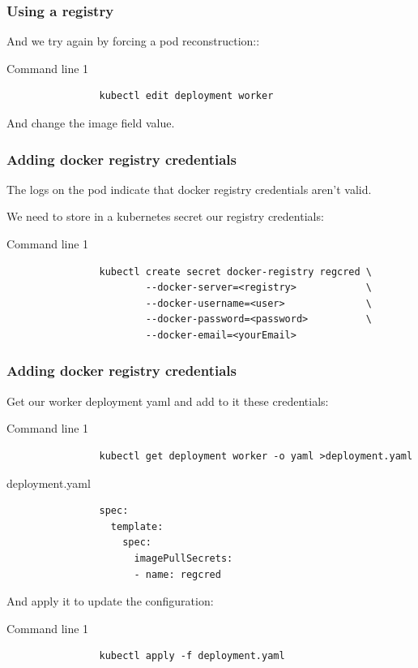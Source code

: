 	\begin{frame}[fragile]
		\frametitle{Using a registry}
	
		And we try again by forcing a pod reconstruction::
		\begin{block}{Command line 1}
			\begin{verbatim}
				kubectl edit deployment worker
			\end{verbatim}
			\medskip
			And change the image field value.
		\end{block}
	
	\end{frame}

	\begin{frame}[fragile]
		\frametitle{Adding docker registry credentials}
		
		The logs on the pod indicate that docker registry credentials aren't valid.
		
		We need to store in a kubernetes secret our registry credentials:
		\begin{block}{Command line 1}
			\begin{verbatim}
				kubectl create secret docker-registry regcred \
				        --docker-server=<registry>            \
				        --docker-username=<user>              \
				        --docker-password=<password>          \
				        --docker-email=<yourEmail>
			\end{verbatim}
		\end{block}
	\end{frame}
	
	\begin{frame}[fragile]
		\frametitle{Adding docker registry credentials}
		
		Get our worker deployment yaml and add to it these credentials:
		\begin{block}{Command line 1}
			\begin{verbatim}
				kubectl get deployment worker -o yaml >deployment.yaml
			\end{verbatim}
		\end{block}
		\begin{block}{deployment.yaml}
			\begin{verbatim}
				spec:
				  template:
				    spec:
				      imagePullSecrets:
				      - name: regcred
			\end{verbatim}
		\end{block}
		
		And apply it to update the configuration:
		\begin{block}{Command line 1}
			\begin{verbatim}
				kubectl apply -f deployment.yaml
			\end{verbatim}
		\end{block}
	\end{frame}
